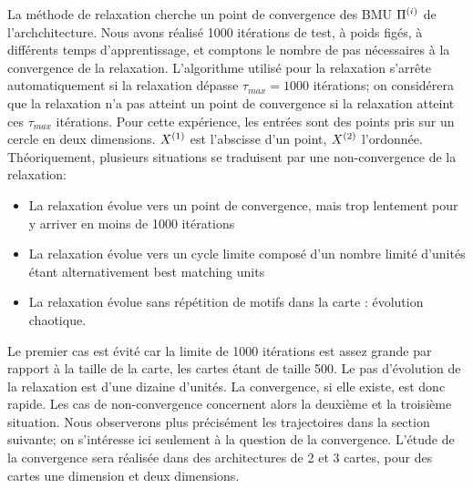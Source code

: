 La méthode de relaxation cherche un point de convergence des BMU $\Pi^{({i})}$ de l'archchitecture. Nous avons réalisé 1000 itérations de test, à poids figés, à différents temps d'apprentissage, et comptons le nombre de pas nécessaires à la convergence de la relaxation. L'algorithme utilisé pour la relaxation s'arrête automatiquement si la relaxation dépasse $\tau_{max}= 1000$ itérations; on considérera que la relaxation n'a pas atteint un point de convergence si la relaxation atteint ces $\tau_{max}$ itérations.
Pour cette expérience, les entrées sont des points pris sur un cercle en deux dimensions. $X^{({1})}$ est l'abscisse d'un point, $X^{({2})}$ l'ordonnée.
Théoriquement, plusieurs situations se traduisent par une non-convergence de la relaxation:
\begin{itemize}
\item La relaxation évolue vers un point de convergence, mais trop lentement pour y arriver en moins de 1000 itérations
\item La relaxation évolue vers un cycle limite composé d'un nombre limité d'unités étant alternativement best matching units
\item La relaxation évolue sans répétition de motifs dans la carte : évolution chaotique.
\end{itemize}
Le premier cas est évité car la limite de 1000 itérations est assez grande par rapport à la taille de la carte, les cartes étant de taille 500. Le pas d'évolution de la relaxation est d'une dizaine d'unités. La convergence, si elle existe, est donc rapide. Les cas de non-convergence concernent alors la deuxième et la troisième situation.
Nous observerons plus précisément les trajectoires dans la section suivante; on s'intéresse ici seulement à la question de la convergence.
L'étude de la convergence sera réalisée dans des architectures de 2 et 3 cartes, pour des cartes une dimension et deux dimensions.

